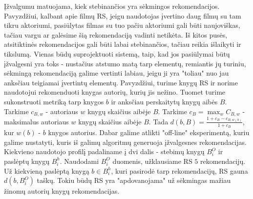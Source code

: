 \documentclass{VUMIFInfMagistrinis}
\begin{document}
Įžvalgumu matuojama, kiek stebinančios yra sėkmingos rekomendacijos. Pavyzdžiui, kalbant apie filmų RS, jeigu naudotojas įvertino daug filmų su tam tikru aktoriumi, pasiūlytas filmas su tuo pačiu aktoriumi gali būti naujoviškas, tačiau vargu ar galėsime šią rekomendaciją vadinti netikėta. Iš kitos pusės, atsitiktinės rekomendacijos gali būti labai stebinančios, tačiau reikia išlaikyti ir tikslumą.
\newline
\indent
Vienas būdų suprojektuoti sistemą, taip, kad jos pasiūlymai būtų įžvalgesni yra toks - nustačius atstumo matą tarp elementų, remiantis jų turiniu, sėkmingą rekomendaciją galime vertinti labiau, jeigu ji yra "toliau" nuo jau anksčiau teigiamai įvertintų elementų. Pavyzdžiui, turime knygų RS ir norime naudotojui rekomenduoti knygas autorių, kurių jis nežino. Tuomet turime sukonstruoti metriką tarp knygos $b$ ir anksčiau perskaitytų knygų aibės $B$. Tarkime $c_{B,w}$ - autoriaus $w$ knygų skaičius aibėje $B$. Tarkime $c_B= \max _w C_{B,w}$ - maksimalus autoriaus $w$ knygų skaičius aibėje $B$. Tada $d(b, B)= \frac{1+c_B - c_{B,w(b)}}{1+c_B}$, kur $w(b)$ - $b$ knygos autorius.
\newline
\indent
Dabar galime atlikti "off-line" eksperimentą, kuriu galime nustatyti, kuris iš galimų algoritmų generuoja įžvalgesnes rekomendacijas. Kiekvieno naudotojo profilį padaliname į dvi dalis - stebimų knygų $B_i^O$ ir paslėptų knygų $B_i^h$. Naudodami $B_i^O$ duomenis, užklausiame RS $5$ rekomendacijų. Už kiekvieną paslėptą knygą $b \in B_i^h$, kuri pasirodė tarp rekomendacijų, RS gauna $d(b, B_i^O)$ taškų. Tokiu būdų RS yra "apdovanojama" už sėkmingas mažiau žinomų autorių knygų rekomendacijas.
\end{document}
